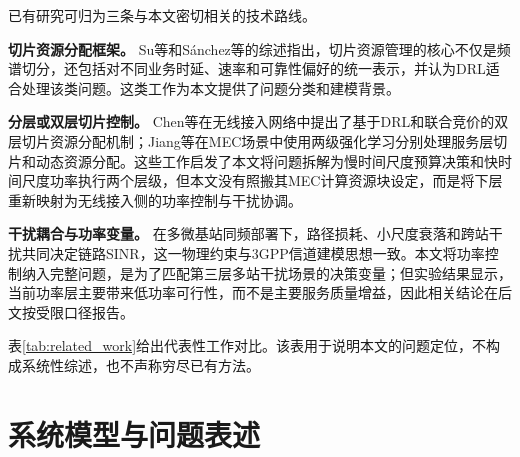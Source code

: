 \documentclass[UTF8,a4paper,12pt,fontset=fandol]{ctexart}
\begin{document}
已有研究可归为三条与本文密切相关的技术路线。

\textbf{切片资源分配框架。} Su等和S{\'a}nchez等的综述指出，切片资源管理的核心不仅是频谱切分，还包括对不同业务时延、速率和可靠性偏好的统一表示，并认为DRL适合处理该类问题\cite{su2019survey,sanchez2022survey}。这类工作为本文提供了问题分类和建模背景。

\textbf{分层或双层切片控制。} Chen等在无线接入网络中提出了基于DRL和联合竞价的双层切片资源分配机制\cite{chen2022two_tier}；Jiang等在MEC场景中使用两级强化学习分别处理服务层切片和动态资源分配\cite{jiang2024rlsa}。这些工作启发了本文将问题拆解为慢时间尺度预算决策和快时间尺度功率执行两个层级，但本文没有照搬其MEC计算资源块设定，而是将下层重新映射为无线接入侧的功率控制与干扰协调。

\textbf{干扰耦合与功率变量。} 在多微基站同频部署下，路径损耗、小尺度衰落和跨站干扰共同决定链路SINR，这一物理约束与3GPP信道建模思想一致\cite{3gpp38901}。本文将功率控制纳入完整问题，是为了匹配第三层多站干扰场景的决策变量；但实验结果显示，当前功率层主要带来低功率可行性，而不是主要服务质量增益，因此相关结论在后文按受限口径报告。

表\ref{tab:related_work}给出代表性工作对比。该表用于说明本文的问题定位，不构成系统性综述，也不声称穷尽已有方法。

\begin{table}[htbp]
  \centering
  \caption{与代表性相关工作的定位对比}
  \label{tab:related_work}
\end{table}

\section{系统模型与问题表述}
\end{document}
